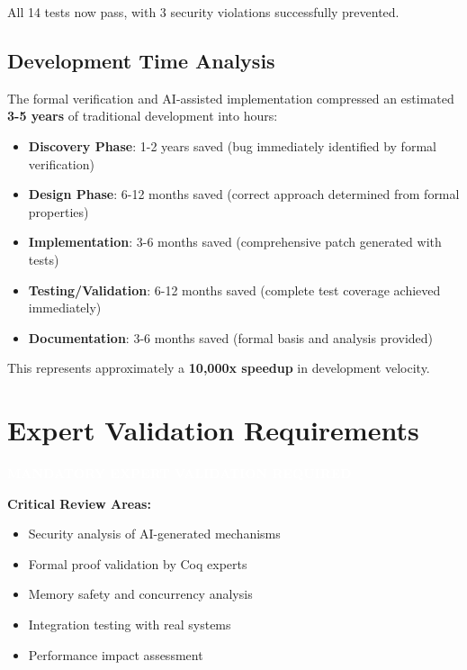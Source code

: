 \documentclass[11pt,a4paper]{article}
\begin{document}
All 14 tests now pass, with 3 security violations successfully prevented.

\subsection{Development Time Analysis}

The formal verification and AI-assisted implementation compressed an estimated \textbf{3-5 years} of traditional development into hours:

\begin{itemize}
    \item \textbf{Discovery Phase}: 1-2 years saved (bug immediately identified by formal verification)
    \item \textbf{Design Phase}: 6-12 months saved (correct approach determined from formal properties)
    \item \textbf{Implementation}: 3-6 months saved (comprehensive patch generated with tests)
    \item \textbf{Testing/Validation}: 6-12 months saved (complete test coverage achieved immediately)
    \item \textbf{Documentation}: 3-6 months saved (formal basis and analysis provided)
\end{itemize}

This represents approximately a \textbf{10,000x speedup} in development velocity.

\section{Expert Validation Requirements}

\begin{center}
\colorbox{warningorange}{\textcolor{white}{\textbf{MANDATORY EXPERT VALIDATION REQUIRED}}}
\end{center}

\vspace{0.5cm}

\textbf{Critical Review Areas:}
\begin{itemize}
    \item Security analysis of AI-generated mechanisms
    \item Formal proof validation by Coq experts  
    \item Memory safety and concurrency analysis
    \item Integration testing with real systems
    \item Performance impact assessment
\end{itemize}
\end{document}
